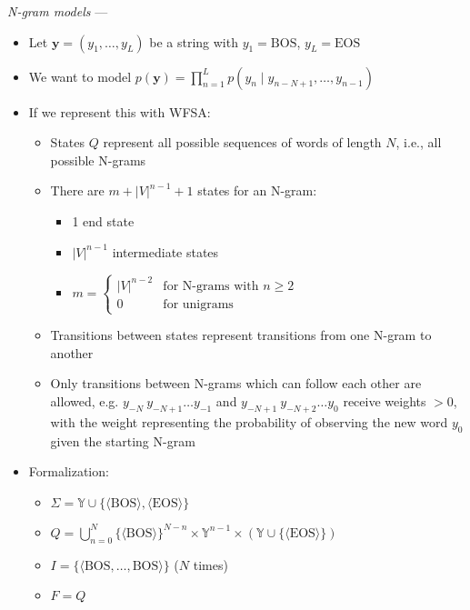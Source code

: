 \emph{N-gram models} --- 
\begin{itemize}
    \item Let $\boldsymbol{y} = (y_1, \ldots, y_L)$ be a string with $y_1 = \textrm{BOS}$, $y_L = \textrm{EOS}$
    \item We want to model 
    $
    p(\boldsymbol{y}) = \prod_{n=1}^L p(y_n \mid y_{n-N+1}, \ldots, y_{n-1})
    $
    \item If we represent this with WFSA:
    \begin{itemize}
        \item States $Q$ represent all possible sequences of words of length $N$, i.e., all possible N-grams
        \item There are $m + |V|^{n-1} + 1$ states for an N-gram:
        \begin{itemize}
            \item 1 end state
            \item $|V|^{n-1}$ intermediate states
            \item $m = \begin{cases} 
                |V|^{n-2} & \textrm{for N-grams with } n \geq 2 \\ 
                0 & \textrm{for unigrams} 
            \end{cases}$
        \end{itemize}
        \item Transitions between states represent transitions from one N-gram to another \item Only transitions between N-grams which can follow each other are allowed, e.g.
        $
        y_{-N} \ y_{-N+1} \dots y_{-1}
        $
        and 
        $
        y_{-N+1} \ y_{-N+2} \dots y_{0}
        $
        receive weights $> 0$, with the weight representing the probability of observing the new word $y_0$ given the starting N-gram
    \end{itemize}
    \item Formalization:
    \begin{itemize}
        \item $\Sigma = \mathbb{Y} \cup \{\langle \textrm{BOS} \rangle, \langle\textrm{EOS} \rangle\}$
        \item $Q = \bigcup_{n=0}^N \{\langle \textrm{BOS} \rangle\}^{N-n} \times \mathbb{Y}^{n-1} \times (\mathbb{Y} \cup \{\langle \textrm{EOS} \rangle\})$
        \item $I = \{\langle \textrm{BOS}, \ldots, \textrm{BOS} \rangle\}$ ($N$ times)
        \item $F = Q$

\end{itemize}
\end{itemize}
